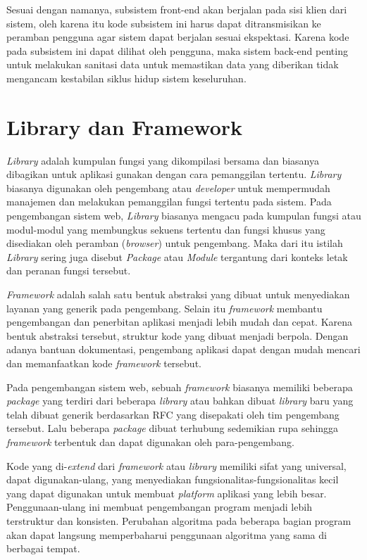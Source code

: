     Sesuai dengan namanya, subsistem front-end akan berjalan pada sisi klien
    dari sistem, oleh karena itu kode subsistem ini harus dapat ditransmisikan
    ke peramban pengguna agar sistem dapat berjalan sesuai ekspektasi. Karena
    kode pada subsistem ini dapat dilihat oleh pengguna, maka sistem back-end
    penting untuk melakukan sanitasi data untuk memastikan data yang diberikan
    tidak mengancam kestabilan siklus hidup sistem keseluruhan.

\section{Library dan Framework}
    \textit{Library} adalah kumpulan fungsi yang dikompilasi bersama dan
    biasanya dibagikan untuk aplikasi gunakan dengan cara pemanggilan tertentu.
    \textit{Library} biasanya digunakan oleh pengembang atau \emph{developer}
    untuk mempermudah manajemen dan melakukan pemanggilan fungsi tertentu pada
    sistem. Pada pengembangan sistem web, \textit{Library} biasanya mengacu pada
    kumpulan fungsi atau modul-modul yang membungkus sekuens tertentu dan fungsi
    khusus yang disediakan oleh peramban (\textit{browser}) untuk pengembang.
    Maka dari itu istilah \textit{Library} sering juga disebut \textit{Package}
    atau \textit{Module} tergantung dari konteks letak dan peranan fungsi
    tersebut\cite{npm-docs:packages-n-modules}\cite{node-docs:CommonJS-modules}.
    
    \textit{Framework} adalah salah satu bentuk abstraksi yang dibuat untuk
    menyediakan layanan yang generik pada pengembang. Selain itu
    \textit{framework} membantu pengembangan dan penerbitan aplikasi menjadi
    lebih mudah dan cepat. Karena bentuk abstraksi tersebut, struktur kode yang
    dibuat menjadi berpola. Dengan adanya bantuan dokumentasi, pengembang
    aplikasi dapat dengan mudah mencari dan memanfaatkan kode \textit{framework}
    tersebut.
    
    Pada pengembangan sistem web, sebuah \textit{framework} biasanya memiliki
    beberapa \textit{package} yang terdiri dari beberapa \textit{library} atau
    bahkan dibuat \textit{library} baru yang telah dibuat generik berdasarkan
    RFC yang disepakati oleh tim pengembang tersebut\cite{reactjs:rfc}. Lalu
    beberapa \textit{package} dibuat terhubung sedemikian rupa sehingga
    \textit{framework} terbentuk dan dapat digunakan oleh para-pengembang.
    
    Kode yang di-\textit{extend} dari \textit{framework} atau \textit{library}
    memiliki sifat yang universal, dapat digunakan-ulang, yang menyediakan
    fungsionalitas-fungsionalitas kecil yang dapat digunakan untuk membuat
    \textit{platform} aplikasi yang lebih besar. Penggunaan-ulang ini membuat
    pengembangan program menjadi lebih terstruktur dan konsisten. Perubahan
    algoritma pada beberapa bagian program akan dapat langsung memperbaharui
    penggunaan algoritma yang sama di berbagai tempat.
    
